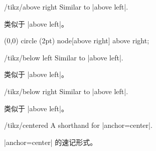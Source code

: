 \begin{key}{/tikz/above right}
    Similar to  |above left|.
    
    类似于 |above left|。

\begin{codeexample}[]
\tikz \fill (0,0) circle (2pt) node[above right] {above right};
\end{codeexample}
\end{key}

\begin{key}{/tikz/below left}
    Similar to |above left|.

    类似于 |above left|。

\end{key}

\begin{key}{/tikz/below right}
    Similar to |above left|.

    类似于 |above left|。

\end{key}

\begin{key}{/tikz/centered}
    A shorthand for |anchor=center|.

    |anchor=center| 的速记形式。


\end{key}



